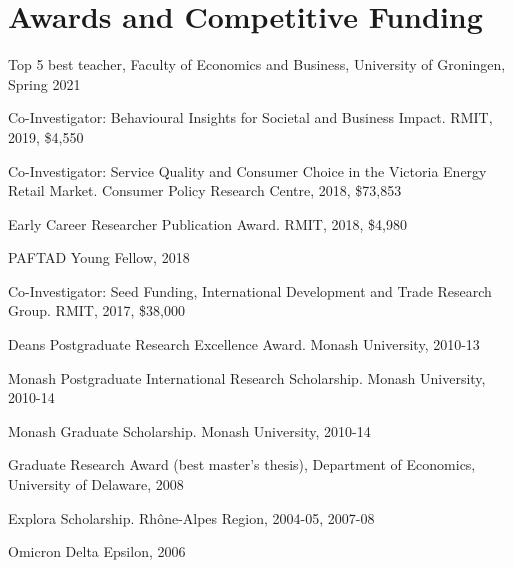 \documentclass[letterpaper]{article}
\renewenvironment{itemize}{
  \begin{list}{}{
    \setlength{\leftmargin}{1.5em}
  }
}{
  \end{list}
}
\begin{document}
\section*{Awards and Competitive Funding}
\begin{itemize}
	\item Top 5 best teacher, Faculty of Economics and Business, University of Groningen, Spring 2021
	\item Co-Investigator: Behavioural Insights for Societal and Business Impact. RMIT, 2019, \$4,550
	\item Co-Investigator: Service Quality and Consumer Choice in the Victoria Energy Retail Market. Consumer Policy Research Centre, 2018, \$73,853
	\item Early Career Researcher Publication Award. RMIT, 2018, \$4,980
	\item PAFTAD Young Fellow, 2018
	\item Co-Investigator: Seed Funding, International Development and Trade Research Group. RMIT, 2017, \$38,000
	\item Dean\textquotesingle s Postgraduate Research Excellence Award. Monash University, 
	2010-13 	
	\item Monash Postgraduate International Research Scholarship. Monash University, 2010-14 	
	\item Monash Graduate Scholarship. Monash University, 2010-14
	\item Graduate Research Award (best master's thesis), Department of Economics, University of Delaware, 2008
	\item Explo\textquotesingle ra Scholarship. Rh\^one-Alpes Region, 2004-05, 2007-08
	\item Omicron Delta Epsilon, 2006
	
\end{itemize}
\end{document}

